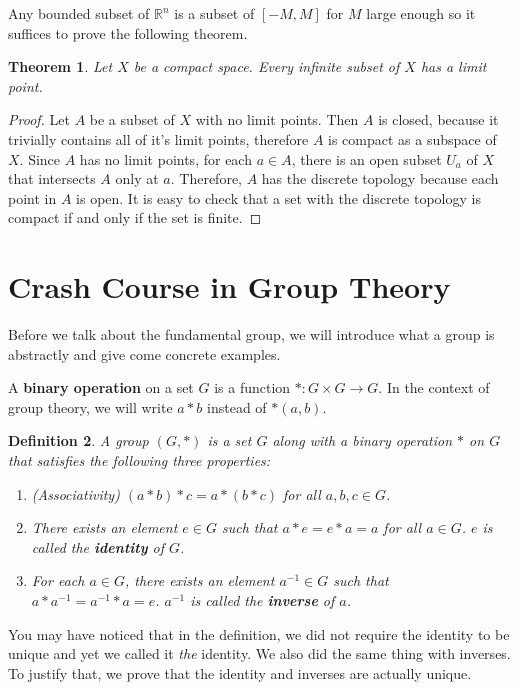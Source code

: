 \documentclass[a4paper]{article}
\newtheorem{theorem}{Theorem}
\newtheorem{definition}[theorem]{Definition}
\numberwithin{theorem}{section}
\begin{document}
Any bounded subset of $\mathbb{R}^n$ is a subset of $[-M,M]$ for $M$ large enough so it suffices to prove the following theorem.

\begin{theorem}
Let $X$ be a compact space. Every infinite subset of $X$ has a limit point.
\end{theorem}

\begin{proof}
Let $A$ be a subset of $X$ with no limit points. Then $A$ is closed, because it trivially contains all of it's limit points, therefore $A$ is compact as a subspace of $X$. Since $A$ has no limit points, for each $a \in A$, there is an open subset $U_a$ of $X$ that intersects $A$ only at $a$. Therefore, $A$ has the discrete topology because each point in $A$ is open. It is easy to check that a set with the discrete topology is compact if and only if the set is finite.
\end{proof}


\section{Crash Course in Group Theory}

Before we talk about the fundamental group, we will introduce what a group is abstractly and give come concrete examples.

A \textbf{binary operation} on a set $G$ is a function $\ast: G \times G \rightarrow G$. In the context of group theory, we will write $a \ast b$ instead of $\ast(a,b)$.

\begin{definition}
A group $(G, \ast)$ is a set $G$ along with a binary operation $\ast$ on $G$ that satisfies the following three properties:

\begin{enumerate}
    \item (Associativity) $(a \ast b) \ast c = a \ast (b \ast c)$ for all $a,b,c \in G$.
    \item There exists an element $e \in G$ such that $a \ast e = e \ast a = a$ for all $a \in G$. $e$ is called the \textbf{identity} of $G$.
    \item For each $a \in G$, there exists an element $a^{-1} \in G$ such that $a \ast a^{-1} = a^{-1} \ast a = e$. $a^{-1}$ is called the \textbf{inverse} of $a$.
\end{enumerate}
\end{definition}

You may have noticed that in the definition, we did not require the identity to be unique and yet we called it \textit{the} identity. We also did the same thing with inverses. To justify that, we prove that the identity and inverses are actually unique.
\end{document}
